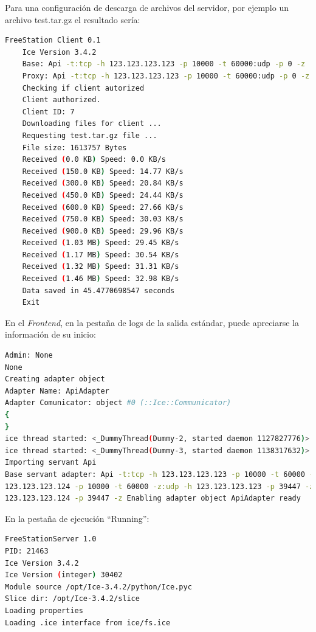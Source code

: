     Para una configuración de descarga de archivos del servidor, por ejemplo un
    archivo test.tar.gz el resultado sería:
    
    \begin{lstlisting}[language={bash}, texcl=false, caption={Conexión con
    éxito para descarga de archivos}] FreeStation Client 0.1
    Ice Version 3.4.2
    Base: Api -t:tcp -h 123.123.123.123 -p 10000 -t 60000:udp -p 0 -z
    Proxy: Api -t:tcp -h 123.123.123.123 -p 10000 -t 60000:udp -p 0 -z
    Checking if client autorized
    Client authorized.
    Client ID: 7
    Downloading files for client ...
    Requesting test.tar.gz file ...
    File size: 1613757 Bytes
    Received (0.0 KB) Speed: 0.0 KB/s
    Received (150.0 KB) Speed: 14.77 KB/s
    Received (300.0 KB) Speed: 20.84 KB/s
    Received (450.0 KB) Speed: 24.44 KB/s
    Received (600.0 KB) Speed: 27.66 KB/s
    Received (750.0 KB) Speed: 30.03 KB/s
    Received (900.0 KB) Speed: 29.96 KB/s
    Received (1.03 MB) Speed: 29.45 KB/s
    Received (1.17 MB) Speed: 30.54 KB/s
    Received (1.32 MB) Speed: 31.31 KB/s
    Received (1.46 MB) Speed: 32.98 KB/s
    Data saved in 45.4770698547 seconds
    Exit
    \end{lstlisting}

    En el \emph{Frontend}, en la pestaña de logs de la salida estándar, puede
    apreciarse la información de su inicio:
    
    \begin{lstlisting}[language={bash}, texcl=false, caption={Ejemplo de
    pestaña de salida estándar}] Admin: None
None
Creating adapter object
Adapter Name: ApiAdapter
Adapter Comunicator: object #0 (::Ice::Communicator)
{
}
ice thread started: <_DummyThread(Dummy-2, started daemon 1127827776)> thread locals: {'my_test_var': '_threading_local.local works'}
ice thread started: <_DummyThread(Dummy-3, started daemon 1138317632)> thread locals: {'my_test_var': '_threading_local.local works'}
Importing servant Api
Base servant adapter: Api -t:tcp -h 123.123.123.123 -p 10000 -t 60000 -z:tcp -h
123.123.123.124 -p 10000 -t 60000 -z:udp -h 123.123.123.123 -p 39447 -z:udp -h
123.123.123.124 -p 39447 -z Enabling adapter object ApiAdapter ready
    \end{lstlisting}
   
    En la pestaña de ejecución ``Running'':
    
    \begin{lstlisting}[language={bash}, texcl=false, caption={Ejemplod de
    pestaña Running}] FreeStationServer 1.0
PID: 21463
Ice Version 3.4.2
Ice Version (integer) 30402
Module source /opt/Ice-3.4.2/python/Ice.pyc
Slice dir: /opt/Ice-3.4.2/slice
Loading properties
Loading .ice interface from ice/fs.ice 
    \end{lstlisting}


